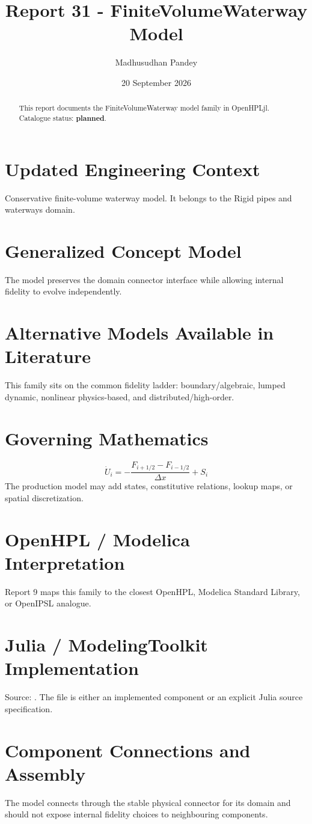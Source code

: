 \documentclass[10pt,a4paper]{article}
\title{Report 31 - FiniteVolumeWaterway Model}
\author{Madhusudhan Pandey}
\date{20 September 2026}
\begin{document}
\maketitle
\begin{abstract}This report documents the FiniteVolumeWaterway model family in OpenHPLjl. Catalogue status: \textbf{planned}.\end{abstract}
\section{Updated Engineering Context}Conservative finite-volume waterway model. It belongs to the Rigid pipes and waterways domain.
\section{Generalized Concept Model}The model preserves the domain connector interface while allowing internal fidelity to evolve independently.
\section{Alternative Models Available in Literature}This family sits on the common fidelity ladder: boundary/algebraic, lumped dynamic, nonlinear physics-based, and distributed/high-order.
\section{Governing Mathematics}\[\dot U_i=-\frac{F_{i+1/2}-F_{i-1/2}}{\Delta x}+S_i\]The production model may add states, constitutive relations, lookup maps, or spatial discretization.
\section{OpenHPL / Modelica Interpretation}Report 9 maps this family to the closest OpenHPL, Modelica Standard Library, or OpenIPSL analogue.
\section{Julia / ModelingToolkit Implementation}Source: \texttt{}. The file is either an implemented component or an explicit Julia source specification.
\section{Component Connections and Assembly}The model connects through the stable physical connector for its domain and should not expose internal fidelity choices to neighbouring components.
\end{document}
